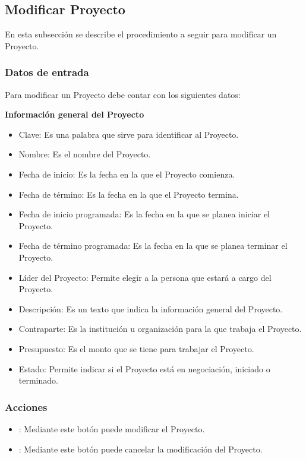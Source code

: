 \subsection{Modificar Proyecto}

En esta subsección se describe el procedimiento a seguir para modificar un Proyecto.


\subsubsection{Datos de entrada}
\begin{description}
	\item Para modificar un Proyecto debe contar con los siguientes datos: \hspace{10pt}
	
	\begin{description}
	    \item \textbf{Información general del Proyecto}
	    \begin{itemize}
		  \item Clave: Es una palabra que sirve para identificar al Proyecto.
		  \item Nombre: Es el nombre del Proyecto.
		  \item Fecha de inicio: Es la fecha en la que el Proyecto comienza.
		  \item Fecha de término: Es la fecha en la que el Proyecto termina.
		  \item Fecha de inicio programada: Es la fecha en la que se planea iniciar el Proyecto.
		  \item Fecha de término programada: Es la fecha en la que se planea terminar el Proyecto.
		  \item Líder del Proyecto: Permite elegir a la persona que estará a cargo del Proyecto.
		  \item Descripción: Es un texto que indica la información general del Proyecto.
		  \item Contraparte: Es la institución u organización para la que trabaja el Proyecto.
		  \item Presupuesto: Es el monto que se tiene para trabajar el Proyecto.
		  \item Estado: Permite indicar si el Proyecto está en negociación, iniciado o terminado.
	    \end{itemize}
	 \end{description}
\end{description}

\subsubsection{Acciones}
\begin{itemize}
  \item {}: Mediante este botón puede modificar el Proyecto.
  \item {}: Mediante este botón puede cancelar la modificación del Proyecto.
\end{itemize}


